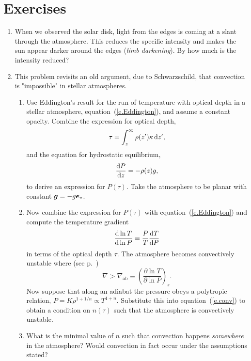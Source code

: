 \section{Exercises}
\begin{enumerate}
\item When we observed the solar disk, light from the edges is coming at a slant through the atmosphere. This reduces the specific intensity and makes the sun appear darker around the edges (\emph{limb darkening}). By how much is the intensity reduced? 

\item This problem revisits an old argument, due to Schwarzschild, that convection is "impossible" in stellar atmospheres.  
\begin{enumerate}
\item Use Eddington's result for the run of temperature with optical depth in a stellar atmosphere, equation~(\ref{e.Eddington}), 
and assume a constant opacity. Combine the expression for optical depth,
\[ \tau = \int_{z}^{\infty}\rho(z')\kappa\, \mathrm{d} z', \]
and the equation for hydrostatic equilibrium,
\[ \frac{\mathrm{d} P}{\mathrm{d} z} = -\rho(z)g, \]
to derive an expression for $P(\tau)$.  Take the atmosphere to be planar with constant $\boldsymbol{g} = -g\boldsymbol{e}_{z}$.

\item Now combine the expression for $P(\tau)$ with equation~(\ref{e.Eddington}) and compute the temperature gradient
\begin{equation}
\frac{\mathrm{d}\ln T}{\mathrm{d}\ln P} \equiv \frac{P}{T}\frac{\mathrm{d} T}{\mathrm{d} P}
\end{equation}
in terms of the optical depth $\tau$.  The atmosphere becomes convectively unstable where (see p.~\pageref{e.schwarzschild})
\begin{equation}\label{e.conv}
 \nabla > \nabla_{\mathrm{ab}} \equiv \left(\frac{\partial\ln T}{\partial\ln P}\right)_{s}.
\end{equation}
Now suppose that along an adiabat the pressure obeys a polytropic relation, $P = K\rho^{1+1/n} \propto T^{1+n}$. Substitute this into equation~(\ref{e.conv}) to obtain a condition on $n(\tau)$ such that the atmosphere is convectively unstable.

\item What is the minimal value of $n$ such that convection happens \emph{somewhere} in the atmosphere? Would convection in fact occur under the assumptions stated?
\end{enumerate}


\end{enumerate}
